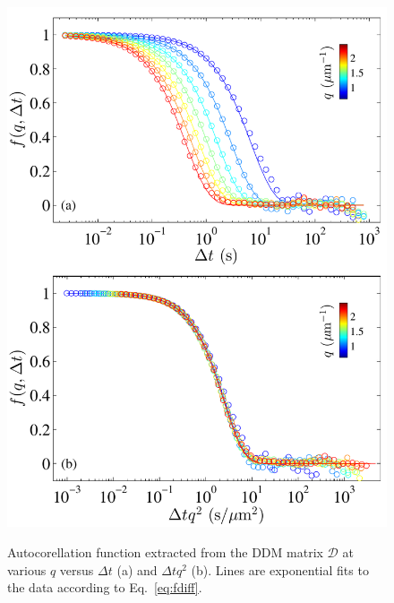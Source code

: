 \documentclass[prb,reprint,amsmath,amssymb]{revtex4-1}
\newcommand{\tg}[1]{{\color{magenta}#1}} %
\begin{document}
\begin{figure}
	\includegraphics[width=\linewidth]{ISFColloides.pdf}\\
	\caption{\tg{Autocorellation function extracted from the DDM matrix $\mathcal{D}$} at various $q$ versus $\Delta t$ (a) and $\Delta tq^2$ (b). Lines are exponential fits to the data according to Eq.~\ref{eq:fdiff}.}
	\label{fig:ISF}
\end{figure}
\end{document}
